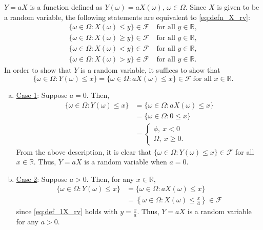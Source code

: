 \documentclass[11pt]{article}
\begin{document}
\begin{enumerate}
\par $Y=aX$ is a function defined as $Y(\omega)=aX(\omega)$, $\omega\in \Omega$. Since $X$ is given to be a random variable, the following statements are equivalent to \eqref{eq:defn_X_rv}:
\begin{align}
\{\omega\in \Omega:X(\omega)\leq y\}\in \mathcal{F}~&\text{for all }y\in \mathbb{R},\label{eq:def_1X_rv}\\
\{\omega\in \Omega:X(\omega)\geq y\}\in \mathcal{F}~&\text{for all }y\in \mathbb{R},\label{eq:def_2X_rv}\\
\{\omega\in \Omega:X(\omega)< y\}\in \mathcal{F}~&\text{for all }y\in \mathbb{R},\label{eq:def_3X_rv}\\
\{\omega\in \Omega:X(\omega)> y\}\in \mathcal{F}~&\text{for all }y\in \mathbb{R}\label{eq:def_4X_rv}.
\end{align}
In order to show that $Y$ is a random variable, it suffices to show that 
\begin{equation}
\{\omega\in \Omega:Y(\omega)\leq x\}=\{\omega\in \Omega:aX(\omega)\leq x\}\in \mathcal{F}~\text{for all }x\in \mathbb{R}.
\end{equation}
\begin{enumerate}[(a)]
	\item \underline{Case 1}: Suppose $a=0$. Then,
	\begin{align}
	\{\omega\in \Omega:Y(\omega)\leq x\}&=\{\omega\in \Omega:aX(\omega)\leq x\}\nonumber\\
	                                    &=\{\omega\in \Omega:0\leq x\}\nonumber\\
	                                    &=\begin{cases}
	                                    \phi,~x<0\\
	                                    \Omega,~x\geq 0.
	                                    \end{cases}
	\end{align}
	From the above description, it is clear that $\{\omega\in \Omega:Y(\omega)\leq x\}\in \mathcal{F}$ for all $x\in \mathbb{R}$. Thus, $Y=aX$ is a random variable when $a=0$.
	
	\item \underline{Case 2}: Suppose $a>0$. Then, for any $x\in \mathbb{R}$,
	\begin{align}
	\{\omega\in \Omega:Y(\omega)\leq x\}&=\{\omega\in \Omega:aX(\omega)\leq x\}\nonumber\\
 	                                    &=\left\lbrace\omega\in\Omega: X(\omega)\leq \frac{x}{a}\right\rbrace\in \mathcal{F}
	\end{align}
	since \eqref{eq:def_1X_rv} holds with $y=\frac{x}{a}$. Thus, $Y=aX$ is a random variable for any $a>0$.
	

\end{enumerate}
\end{enumerate}
\end{document}
